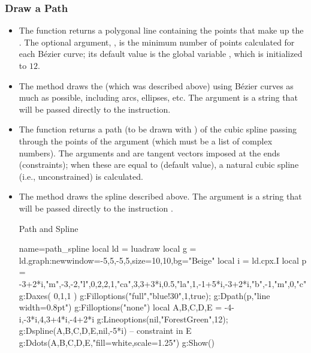 \subsubsection{Draw a Path}

\begin{itemize}
    \item The function  returns a polygonal line containing the points that make up the . The optional argument, , is the minimum number of points calculated for each Bézier curve; its default value is the global variable , which is initialized to $12$.

    \item The  method draws the  (which was described above) using Bézier curves as much as possible, including arcs, ellipses, etc. The  argument is a string that will be passed directly to the \drawcmd instruction.

    \item The function  returns a path (to be drawn with ) of the cubic spline passing through the points of the argument  (which must be a list of complex numbers). The arguments  and  are tangent vectors imposed at the ends (constraints); when these are equal to \nil (default value), a natural cubic spline (i.e., unconstrained) is calculated.

    \item The method  draws the spline described above. The argument  is a string that will be passed directly to the instruction \drawcmd.

\begin{demo}{Path and Spline}
\begin{luadraw}{name=path_spline}
local ld = luadraw
local g = ld.graph:new{window={-5,5,-5,5},size={10,10},bg="Beige"}
local i = ld.cpx.I
local p = {-3+2*i,"m",-3,-2,"l",0,2,2,1,"ca",3,3+3*i,0.5,"la",1,-1+5*i,-3+2*i,"b",-1,"m",0,"c"}
g:Daxes( {0,1,1} )
g:Filloptions("full","blue!30",1,true); g:Dpath(p,"line width=0.8pt")
g:Filloptions("none")
local A,B,C,D,E = -4-i,-3*i,4,3+4*i,-4+2*i
g:Lineoptions(nil,"ForestGreen",12); g:Dspline({A,B,C,D,E},nil,-5*i) -- constraint in E
g:Ddots({A,B,C,D,E},"fill=white,scale=1.25")
g:Show()
\end{luadraw}
\end{demo}


\end{itemize}
